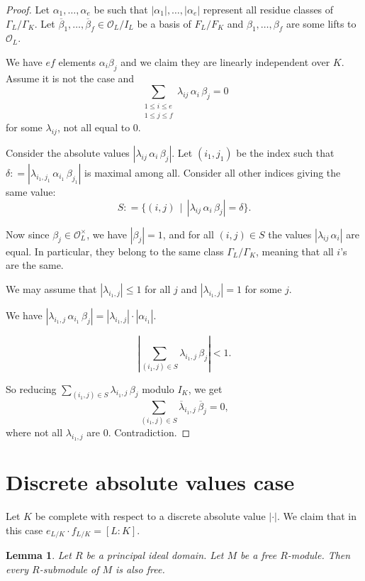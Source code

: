 \documentclass{article}
\newcommand{\dfn}{\mathrel{\mathop:}=}
\theoremstyle{myplain}
\newtheorem{lemma}[proposition]{Lemma}
\theoremstyle{mydefinition}
\begin{document}
\begin{proof}
  Let $\alpha_1, \ldots, \alpha_e$ be such that $|\alpha_1|, \ldots, |\alpha_e|$
  represent all residue classes of $\Gamma_L / \Gamma_K$. Let
  $\overline{\beta}_1, \ldots, \overline{\beta}_f \in \mathcal{O}_L/I_L$ be a basis of
  $F_L/F_K$ and $\beta_1, \ldots, \beta_f$ are some lifts to $\mathcal{O}_L$.

  We have $e f$ elements $\alpha_i \beta_j$ and we claim they are linearly
  independent over $K$. Assume it is not the case and
  $$\sum_{\substack{1 \le i \le e \\ 1 \le j \le f}} \lambda_{ij} \, \alpha_i \, \beta_j = 0$$
  for some $\lambda_{ij}$, not all equal to $0$.

  Consider the absolute values $|\lambda_{ij} \, \alpha_i \, \beta_j|$.
  Let $(i_1, j_1)$ be the index such that
  $\delta \dfn |\lambda_{i_1, j_1} \, \alpha_{i_1} \, \beta_{j_1}|$ is maximal
  among all. Consider all other indices giving the same value:
  $$S \dfn \{ (i,j) \,\mid\, |\lambda_{ij} \, \alpha_i \, \beta_j| = \delta \}.$$

  Now since $\beta_j \in \mathcal{O}_L^\times$, we have $|\beta_j| = 1$, and for all
  $(i,j) \in S$ the values $|\lambda_{ij} \, \alpha_i|$ are equal. In
  particular, they belong to the same class $\Gamma_L/\Gamma_K$, meaning that
  all $i$'s are the same.

  We may assume that $|\lambda_{i_1, j}| \le 1$ for all $j$ and
  $|\lambda_{i_1, j}| = 1$ for some $j$.

  We have
  $|\lambda_{i_1, j} \, \alpha_{i_1} \, \beta_j| = |\lambda_{i_1,j}| \cdot
  |\alpha_{i_1}|$.

  \[ \left| \sum_{(i_1, j) \in S} \lambda_{i_1, j} \, \beta_j \right| < 1. \]

  So reducing $\sum_{(i_1, j) \in S} \lambda_{i_1, j} \, \beta_j$ modulo $I_K$,
  we get
  $$\sum_{(i_1, j) \in S} \overline{\lambda}_{i_1, j} \, \overline{\beta}_j = 0,$$
  where not all $\lambda_{i_1, j}$ are $0$. Contradiction.
\end{proof}

\section{Discrete absolute values case}

Let $K$ be complete with respect to a discrete absolute value $|\cdot|$. We
claim that in this case $e_{L/K}\cdot f_{L/K} = [L:K]$.

\begin{lemma}
  Let $R$ be a principal ideal domain. Let $M$ be a free $R$-module. Then every
  $R$-submodule of $M$ is also free.
\end{lemma}
\end{document}
